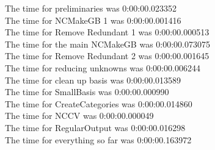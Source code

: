 \documentclass[rep10,leqno]{report}
\begin{document}
\noindent
The time for preliminaries was 0:00:00.023352\\
The time for NCMakeGB 1 was 0:00:00.001416\\
The time for Remove Redundant 1 was 0:00:00.000513\\
The time for the main NCMakeGB was 0:00:00.073075\\
The time for Remove Redundant 2 was 0:00:00.001645\\
The time for reducing unknowns was 0:00:00.006244\\
The time for clean up basis was 0:00:00.013589\\
The time for SmallBasis was 0:00:00.000990\\
The time for CreateCategories was 0:00:00.014860\\
The time for NCCV was 0:00:00.000049\\
The time for RegularOutput was 0:00:00.016298\\
The time for everything so far was 0:00:00.163972\\
\end{document}
